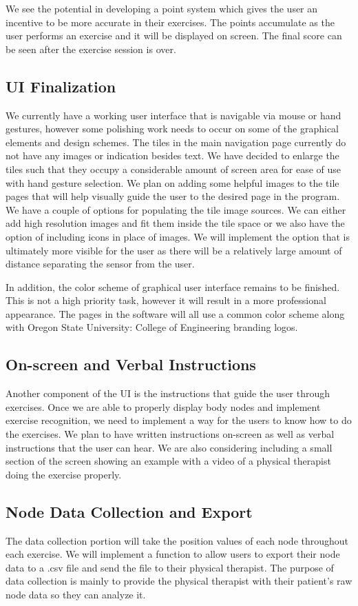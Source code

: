 \documentclass[onecolumn, draftclsnofoot,10pt, compsoc]{IEEEtran}
\begin{document}
We see the potential in developing a point system which gives the user an incentive to be more accurate in their exercises. The points accumulate as the user performs an exercise and it will be displayed on screen. The final score can be seen after the exercise session is over.

\subsection{UI Finalization}
We currently have a working user interface that is navigable via mouse or hand gestures, however some polishing work needs to occur on some of the graphical elements and design schemes. The tiles in the main navigation page currently do not have any images or indication besides text. We have decided to enlarge the tiles such that they occupy a considerable amount of screen area for ease of use with hand gesture selection. We plan on adding some helpful images to the tile pages that will help visually guide the user to the desired page in the program. We have a couple of options for populating the tile image sources. We can either add high resolution images and fit them inside the tile space or we also have the option of including icons in place of images. We will implement the option that is ultimately more visible for the user as there will be a relatively large amount of distance separating the sensor from the user. 

In addition, the color scheme of graphical user interface remains to be finished. This is not a high priority task, however it will result in a more professional appearance. The pages in the software will all use a common color scheme along with Oregon State University: College of Engineering branding logos. 

\subsection{On-screen and Verbal Instructions}
Another component of the UI is the instructions that guide the user through exercises. Once we are able to properly display body nodes and implement exercise recognition, we need to implement a way for the users to know how to do the exercises. We plan to have written instructions on-screen as well as verbal instructions that the user can hear. We are also considering including a small section of the screen showing an example with a video of a physical therapist doing the exercise properly.

\subsection{Node Data Collection and Export}
The data collection portion will take the position values of each node throughout each exercise. We will implement a function to allow users to export their node data to a .csv file and send the file to their physical therapist. The purpose of data collection is mainly to provide the physical therapist with their patient's raw node data so they can analyze it.
\end{document}
